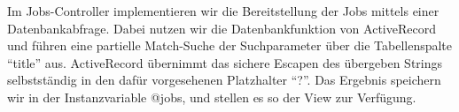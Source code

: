 %                                                                                                                                          

Im Jobs-Controller implementieren wir die Bereitstellung der Jobs mittels einer Datenbankabfrage. Dabei nutzen wir die Datenbankfunktion von ActiveRecord und führen eine partielle Match-Suche der Suchparameter über die Tabellenspalte "`title"' aus. ActiveRecord übernimmt das sichere Escapen des übergeben Strings selbstständig in den dafür vorgesehenen Platzhalter "`?"'. Das Ergebnis speichern wir in der Instanzvariable @jobs, und stellen es so der View zur Verfügung.


